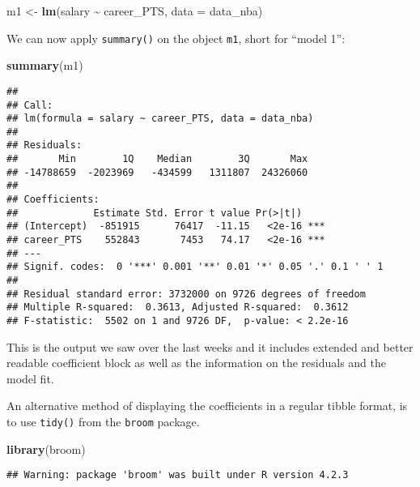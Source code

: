 \documentclass[
]{book}
\newenvironment{Shaded}{\begin{snugshade}}{\end{snugshade}}
\newcommand{\AttributeTok}[1]{\textcolor[rgb]{0.13,0.29,0.53}{#1}}
\newcommand{\FunctionTok}[1]{\textcolor[rgb]{0.13,0.29,0.53}{\textbf{#1}}}
\newcommand{\NormalTok}[1]{#1}
\newcommand{\OtherTok}[1]{\textcolor[rgb]{0.56,0.35,0.01}{#1}}
\newcommand{\SpecialCharTok}[1]{\textcolor[rgb]{0.81,0.36,0.00}{\textbf{#1}}}
\begin{document}
\begin{Shaded}
\begin{Highlighting}[]
\NormalTok{m1 }\OtherTok{\textless{}{-}} \FunctionTok{lm}\NormalTok{(salary }\SpecialCharTok{\textasciitilde{}}\NormalTok{ career\_PTS, }\AttributeTok{data =}\NormalTok{ data\_nba)}
\end{Highlighting}
\end{Shaded}

We can now apply \texttt{summary()} on the object \texttt{m1}, short for ``model 1'':

\begin{Shaded}
\begin{Highlighting}[]
\FunctionTok{summary}\NormalTok{(m1)}
\end{Highlighting}
\end{Shaded}

\begin{verbatim}
## 
## Call:
## lm(formula = salary ~ career_PTS, data = data_nba)
## 
## Residuals:
##       Min        1Q    Median        3Q       Max 
## -14788659  -2023969   -434599   1311807  24326060 
## 
## Coefficients:
##             Estimate Std. Error t value Pr(>|t|)    
## (Intercept)  -851915      76417  -11.15   <2e-16 ***
## career_PTS    552843       7453   74.17   <2e-16 ***
## ---
## Signif. codes:  0 '***' 0.001 '**' 0.01 '*' 0.05 '.' 0.1 ' ' 1
## 
## Residual standard error: 3732000 on 9726 degrees of freedom
## Multiple R-squared:  0.3613, Adjusted R-squared:  0.3612 
## F-statistic:  5502 on 1 and 9726 DF,  p-value: < 2.2e-16
\end{verbatim}

This is the output we saw over the last weeks and it includes extended and
better readable coefficient block as well as the information on the residuals
and the model fit.

An alternative method of displaying the coefficients in a regular tibble format,
is to use \texttt{tidy()} from the \texttt{broom} package.

\begin{Shaded}
\begin{Highlighting}[]
\FunctionTok{library}\NormalTok{(broom)}
\end{Highlighting}
\end{Shaded}

\begin{verbatim}
## Warning: package 'broom' was built under R version 4.2.3
\end{verbatim}
\end{document}
